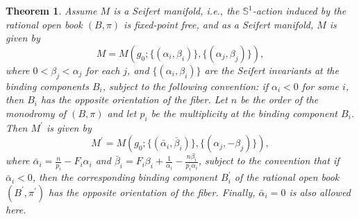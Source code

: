 \documentclass[10pt,a4paper]{amsart}
\newtheorem{theorem}{Theorem}
\newcommand{\s}{{\mathbb S}}
\begin{document}
\begin{theorem}
Assume $M$ is a Seifert manifold, i.e., the $\s^1$-action induced by the rational open book 
$(B,\pi)$ is fixed-point free, and as a Seifert manifold, $M$ is given by 
$$
M=M(g_0; \{(\alpha_i,\beta_i)\}, \{(\alpha_j,\beta_j)\}),
$$
where $0<\beta_j<\alpha_j$ for each $j$, and $\{(\alpha_i,\beta_i)\}$ are the Seifert invariants at
the binding components $B_i$, subject to the following convention: if $\alpha_i<0$ for some $i$, 
then $B_i$ has the opposite orientation of the fiber.  Let $n$ be the order of the monodromy of 
$(B,\pi)$ and let $p_i$ be the multiplicity at the binding component $B_i$. 
Then $M^\prime$ is given by
$$
M^\prime=M(g_0; \{(\bar{\alpha}_i,\bar{\beta}_i)\}, \{(\alpha_j,-\beta_j)\}),
$$
where $\bar{\alpha}_i=\frac{n}{p_i}-F_i\alpha_i$ and 
$\bar{\beta}_i=F_i\beta_i+\frac{1}{\alpha_i}-\frac{n\beta_i}{p_i\alpha_i}$, subject to the convention that
if $\bar{\alpha}_i<0$, then the corresponding binding component $B_i^\prime$ of the rational open 
book $(B^\prime,\pi^\prime)$ has the opposite orientation of the fiber. Finally, $\bar{\alpha}_i=0$
is also allowed here.  
\end{theorem}
\end{document}
